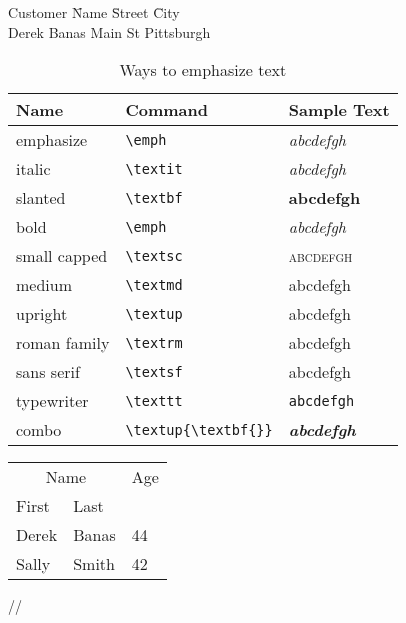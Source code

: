 \documentclass[a4paper,12pt]{book}
\begin{document}

\begin{tabbing}

Customer  \= Name \hspace*{1.5cm} \= Street \hspace*{1.5cm} \= City \\

\> Derek Banas  Main St \> Pittsburgh \\
\end{tabbing}


\begin{table}
\begin{tabular}{l|l|l}

\hline

\textbf{Name} & \textbf{Command} & \textbf{Sample Text} \\
\hline
emphasize & \verb|\emph| & \emph{abcdefgh} \\
italic & \verb|\textit| & \textit{abcdefgh} \\
slanted & \verb|\textbf| & \textbf{abcdefgh} \\
bold & \verb|\emph| & \emph{abcdefgh} \\
small capped & \verb|\textsc| & \textsc{abcdefgh} \\
medium & \verb|\textmd| & \textmd{abcdefgh} \\
upright & \verb|\textup| & \textup{abcdefgh} \\
roman family & \verb|\textrm| & \textrm{abcdefgh} \\
sans serif & \verb|\textsf| & \textsf{abcdefgh} \\
typewriter & \verb|\texttt| & \texttt{abcdefgh} \\
combo & \verb|\textup{\textbf{}}| & \textit{\textbf{abcdefgh}} \\
\end{tabular}
\caption{Ways to emphasize text}
\end{table}

\begin{tabular}{@{}*3l@{}}

\multicolumn{2}{c}{Name} &
\multicolumn{1}{c}{Age}\\

First & Last & \\
\hline
Derek & Banas & 44\\
Sally & Smith & 42\\
\end{tabular}//
\end{document}
